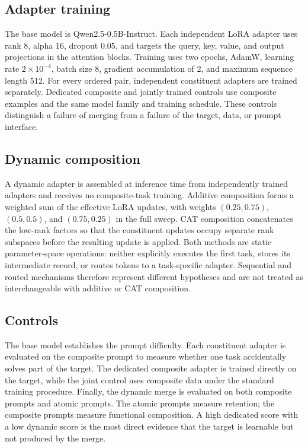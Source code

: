 \documentclass[10pt,twocolumn]{article}
\begin{document}
\subsection{Adapter training}

The base model is Qwen2.5-0.5B-Instruct. Each independent LoRA adapter uses rank 8, alpha 16, dropout 0.05, and targets the query, key, value, and output projections in the attention blocks. Training uses two epochs, AdamW, learning rate $2\times10^{-4}$, batch size 8, gradient accumulation of 2, and maximum sequence length 512. For every ordered pair, independent constituent adapters are trained separately. Dedicated composite and jointly trained controls use composite examples and the same model family and training schedule. These controls distinguish a failure of merging from a failure of the target, data, or prompt interface.

\subsection{Dynamic composition}

A dynamic adapter is assembled at inference time from independently trained adapters and receives no composite-task training. Additive composition forms a weighted sum of the effective LoRA updates, with weights $(0.25,0.75)$, $(0.5,0.5)$, and $(0.75,0.25)$ in the full sweep. CAT composition concatenates the low-rank factors so that the constituent updates occupy separate rank subspaces before the resulting update is applied. Both methods are static parameter-space operations: neither explicitly executes the first task, stores its intermediate record, or routes tokens to a task-specific adapter. Sequential and routed mechanisms therefore represent different hypotheses and are not treated as interchangeable with additive or CAT composition.

\subsection{Controls}

The base model establishes the prompt difficulty. Each constituent adapter is evaluated on the composite prompt to measure whether one task accidentally solves part of the target. The dedicated composite adapter is trained directly on the target, while the joint control uses composite data under the standard training procedure. Finally, the dynamic merge is evaluated on both composite prompts and atomic prompts. The atomic prompts measure retention; the composite prompts measure functional composition. A high dedicated score with a low dynamic score is the most direct evidence that the target is learnable but not produced by the merge.
\end{document}
